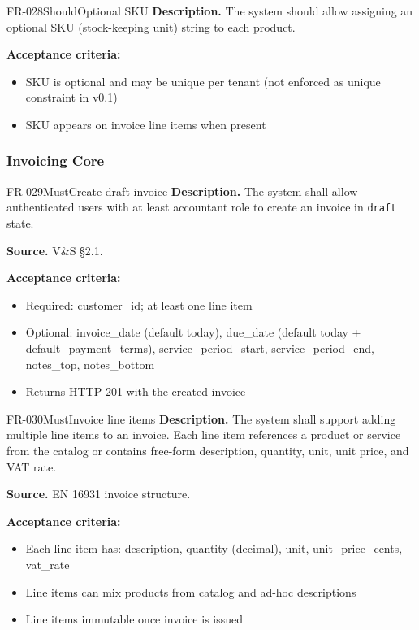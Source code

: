 \documentclass[11pt,a4paper]{article}
\begin{document}
\begin{requirement}{FR-028}{Should}{Optional SKU}
\textbf{Description.} The system should allow assigning an optional SKU (stock-keeping unit) string to each product.

\textbf{Acceptance criteria:}
\begin{itemize}
    \item SKU is optional and may be unique per tenant (not enforced as unique constraint in v0.1)
    \item SKU appears on invoice line items when present
\end{itemize}
\end{requirement}

\subsubsection{Invoicing Core}

\begin{requirement}{FR-029}{Must}{Create draft invoice}
\textbf{Description.} The system shall allow authenticated users with at least accountant role to create an invoice in \texttt{draft} state.

\textbf{Source.} V\&S \S2.1.

\textbf{Acceptance criteria:}
\begin{itemize}
    \item Required: customer\_id; at least one line item
    \item Optional: invoice\_date (default today), due\_date (default today + default\_payment\_terms), service\_period\_start, service\_period\_end, notes\_top, notes\_bottom
    \item Returns HTTP 201 with the created invoice
\end{itemize}
\end{requirement}

\begin{requirement}{FR-030}{Must}{Invoice line items}
\textbf{Description.} The system shall support adding multiple line items to an invoice. Each line item references a product or service from the catalog or contains free-form description, quantity, unit, unit price, and VAT rate.

\textbf{Source.} EN 16931 invoice structure.

\textbf{Acceptance criteria:}
\begin{itemize}
    \item Each line item has: description, quantity (decimal), unit, unit\_price\_cents, vat\_rate
    \item Line items can mix products from catalog and ad-hoc descriptions
    \item Line items immutable once invoice is issued
\end{itemize}
\end{requirement}
\end{document}
